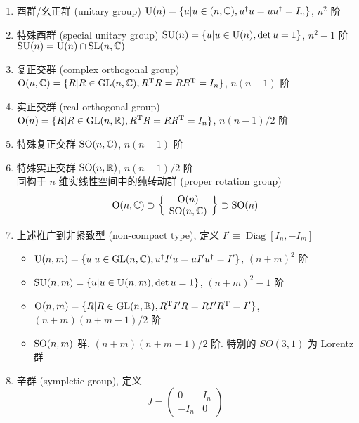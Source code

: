 \documentclass[12pt,a4paper]{article}%
\numberwithin{equation}{section}%
\DeclareMathOperator\diag{Diag}
\begin{document}
\begin{enumerate}
\begin{enumerate}
		\item 酉群/幺正群 (unitary group) $\mathrm{U}(n) = \{u|u\in\mathrm{(}n,\mathbb C), u^\dagger u = uu^\dagger = I_n\}$, $n^2$ 阶
		\item 特殊酉群 (special unitary group) $\mathrm{SU}(n) = \{u|u\in \mathrm{U}(n), \det u = 1\} $, $n^2-1$ 阶\\
		$\mathrm{SU}(n) = \mathrm{U}(n)\cap\mathrm{SL}(n,\mathbb C)$
		\item 复正交群 (complex orthogonal group) $\mathrm{O}(n,\mathbb C) = \{ R| R\in \mathrm{GL}(n,\mathbb C), R^\mathrm{T} R = R R^\mathrm{T} = I_n\}$, $n(n-1)$ 阶
		\item 实正交群 (real orthogonal group) $\mathrm{O}(n) = \{ R| R\in \mathrm{GL}(n,\mathbb R), R^\mathrm{T} R = R R^\mathrm{T} = I_n\}$, $n(n-1)/2$ 阶
		\item 特殊复正交群 $\mathrm{SO}(n,\mathbb C)$, $n(n-1)$ 阶
		\item 特殊实正交群 $\mathrm{SO}(n,\mathbb R)$, $n(n-1)/2$ 阶\\
		同构于 $n$ 维实线性空间中的纯转动群 (proper rotation group)
		\begin{equation}
			\mathrm{O}(n,\mathbb C)\supset\left\{\begin{array}{c}
				\mathrm{O}(n) \\
				\mathrm{SO}(n,\mathbb C)
			\end{array}\right\}\supset \mathrm{SO}(n)
		\end{equation}
		\item 上述推广到非紧致型 (non-compact type), 定义 $I'\equiv\diag[I_n,-I_m]$
		\begin{itemize}
			\item $\mathrm{U}(n,m) = \{u|u\in\mathrm{GL}(n,\mathbb C), u^\dagger I' u = u I' u^\dagger =  I' \}$, $(n+m)^2$ 阶
			\item $\mathrm{SU}(n,m) = \{u|u\in\mathrm{U}(n,m), \det u = 1\}$, $(n+m)^2 - 1$ 阶
			\item $\mathrm{O}(n,m) = \{R|R\in\mathrm{GL}(n,\mathbb R), R^\mathrm{T} I' R = R I' R^\mathrm{T} = I'\}$, $(n+m)(n+m-1)/2$ 阶
			\item $\mathrm{SO}(n,m)$ 群, $(n+m)(n+m-1)/2$ 阶. 特别的 $SO(3,1)$ 为 Lorentz 群
		\end{itemize}
		\item 辛群 (sympletic group), 定义
		\begin{equation}
		 	J = \begin{pmatrix}
			0 & I_n \\
			-I_n & 0
		\end{pmatrix}
		\end{equation}

\end{enumerate}
\end{enumerate}
\end{document}
